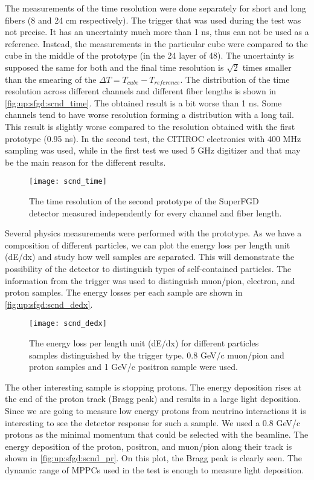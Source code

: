 \documentclass[main.tex]{subfiles}
\begin{document}
The measurements of the time resolution were done separately for short and long fibers (8 and 24 cm respectively). The trigger that was used during the test was not precise. It has an uncertainty much more than 1 ns, thus can not be used as a reference. Instead, the measurements in the particular cube were compared to the cube in the middle of the prototype (in the 24 layer of 48). The uncertainty is supposed the same for both and the final time resolution is $\sqrt{2}$ times smaller than the smearing of the $\Delta T=T_{cube}-T_{reference}$. The distribution of the time resolution across different channels and different fiber lengths is shown in \autoref{fig:up:sfgd:scnd_time}. The obtained result is a bit worse than 1 ns. Some channels tend to have worse resolution forming a distribution with a long tail. This result is slightly worse compared to the resolution obtained with the first prototype (0.95 ns). In the second test, the CITIROC electronics with 400 MHz sampling was used, while in the first test we used 5 GHz digitizer and that may be the main reason for the different results.

\begin{figure}[!ht]
	\centering
	\texttt{[image: scnd\_time]}
	\caption{The time resolution of the second prototype of the SuperFGD detector measured independently for every channel and fiber length.}
	\label{fig:up:sfgd:scnd_time}
\end{figure}

Several physics measurements were performed with the prototype. As we have a composition of different particles, we can plot the energy loss per length unit (dE/dx) and study how well samples are separated. This will demonstrate the possibility of the detector to distinguish types of self-contained particles. The information from the trigger was used to distinguish muon/pion, electron, and proton samples. The energy losses per each sample are shown in \autoref{fig:up:sfgd:scnd_dedx}.

\begin{figure}[!ht]
	\centering
	\texttt{[image: scnd\_dedx]}
	\caption{The energy loss per length unit (dE/dx) for different particles samples distinguished by the trigger type. 0.8 GeV/c muon/pion and proton samples and 1 GeV/c positron sample were used.}
	\label{fig:up:sfgd:scnd_dedx}
\end{figure}

The other interesting sample is stopping protons. The energy deposition rises at the end of the proton track (Bragg peak) and results in a large light deposition. Since we are going to measure low energy protons from neutrino interactions it is interesting to see the detector response for such a sample. We used a 0.8 GeV/c protons as the minimal momentum that could be selected with the beamline. The energy deposition of the proton, positron, and muon/pion along their track is shown in \autoref{fig:up:sfgd:scnd_pr}. On this plot, the Bragg peak is clearly seen. The dynamic range of MPPCs used in the test is enough to measure light deposition.
\end{document}
